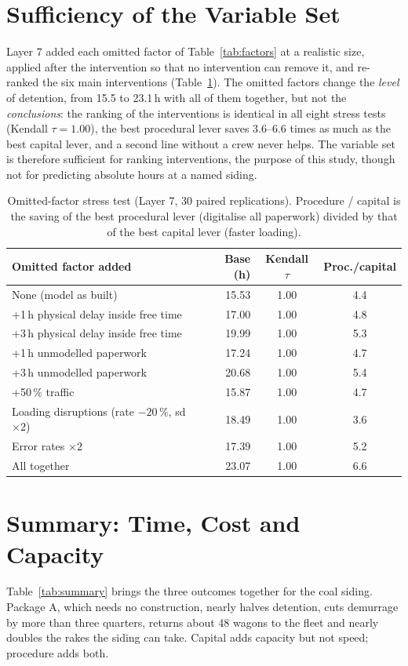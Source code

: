 \section{Sufficiency of the Variable Set}
\label{sec:res_suff}
Layer 7 added each omitted factor of Table~\ref{tab:factors} at a realistic size, applied after the intervention so that no intervention can remove it, and re-ranked the six main interventions (Table~\ref{tab:suff}). The omitted factors change the \emph{level} of detention, from 15.5 to 23.1\,h with all of them together, but not the \emph{conclusions}: the ranking of the interventions is identical in all eight stress tests (Kendall $\tau = 1.00$), the best procedural lever saves 3.6--6.6 times as much as the best capital lever, and a second line without a crew never helps. The variable set is therefore sufficient for ranking interventions, the purpose of this study, though not for predicting absolute hours at a named siding.

\begin{table}[!htbp]
\centering
\caption[Omitted-factor stress test]{Omitted-factor stress test (Layer 7, 30 paired replications). Procedure / capital is the saving of the best procedural lever (digitalise all paperwork) divided by that of the best capital lever (faster loading).}
\label{tab:suff}
\small
\begin{tabular}{@{}lrcc@{}}
\toprule
\textbf{Omitted factor added} & \textbf{Base (h)} & \textbf{Kendall $\tau$} & \textbf{Proc./capital} \\
\midrule
None (model as built) & 15.53 & 1.00 & 4.4 \\
+1\,h physical delay inside free time & 17.00 & 1.00 & 4.8 \\
+3\,h physical delay inside free time & 19.99 & 1.00 & 5.3 \\
+1\,h unmodelled paperwork & 17.24 & 1.00 & 4.7 \\
+3\,h unmodelled paperwork & 20.68 & 1.00 & 5.4 \\
+50\,\% traffic & 15.87 & 1.00 & 4.7 \\
Loading disruptions (rate $-20$\,\%, sd $\times 2$) & 18.49 & 1.00 & 3.6 \\
Error rates $\times 2$ & 17.39 & 1.00 & 5.2 \\
All together & 23.07 & 1.00 & 6.6 \\
\bottomrule
\end{tabular}
\end{table}

\section{Summary: Time, Cost and Capacity}
\label{sec:res_summary}
Table~\ref{tab:summary} brings the three outcomes together for the coal siding. Package A, which needs no construction, nearly halves detention, cuts demurrage by more than three quarters, returns about 48 wagons to the fleet and nearly doubles the rakes the siding can take. Capital adds capacity but not speed; procedure adds both.

